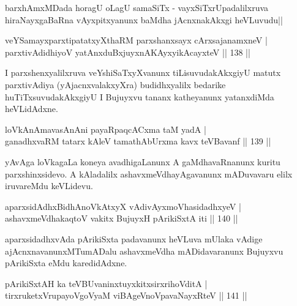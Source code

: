 \begin{artha}
barxhAmxMDada horagU oLagU samaSiTx - vayxSiTxrUpadalilxruva hiraNayxgaBaRna vAyxpitxyanunx baMdha jAcnxnakAkxgi heVLuvudu||
\end{artha}


\begin{shl}
veYSamayxparxtipatatxyXthaRM parxshanxsayx cArxsajanamxneV |\\
parxtivAdidhiyoV yatAnxduBxjuyxnA\s \s KAyxyikAcayxteV \hfill || 138 ||
\end{shl}

\begin{artha}
I parxshenxyalilxruva veYshiSaTxyXvanunx tiLisuvudakAkxgiyU matutx parxtivAdiya (yAjacnxvalakxyXra) budidhxyalilx bedarike huTiTxsuvudakAkxgiyU I Bujuyxvu tananx katheyanunx yatanxdiMda heVLidAdxne.
\end{artha}

\begin{shl}
loVkAnAmavasAnAni payaRpaqcACxma taM yadA |\\
ganadhxvaRM tatarx kAleV tamathAbUrxma kavx teV\s Bavanf \hfill || 139 ||
\end{shl}

\begin{artha}
yAvAga loVkagaLa koneya avadhigaLanunx A gaMdhavaRnanunx kuritu parxshinxsidevo. A kAladalilx ashavxmeVdhayAgavanunx mADuvavaru elilx iruvareMdu keVLidevu.
\end{artha}

\begin{shl}
aparxsidAdhxBidhAnoVkAtxyX vAdivAyxmoVhasidadhxyeV |\\
ashavxmeVdhakaqtoV vakitx BujuyxH pArikiSxtA iti \hfill || 140 ||
\end{shl}

\begin{artha}
aparxsidadhxvAda pArikiSxta padavanunx heVLuva mUlaka vAdige ajAcnxnavanunxMTumADalu ashavxmeVdha mADidavaranunx Bujuyxvu pArikiSxta eMdu karedidAdxne.
\end{artha}


\begin{shl}
pArikiSxtAH ka teV\s BUvaninxtuyxkitxsirxrihoVditA |\\
tirxruketxVrupayoVgoV\s yaM viBAgeVnoVpavaNayxRteV \hfill || 141 ||
\end{shl}

